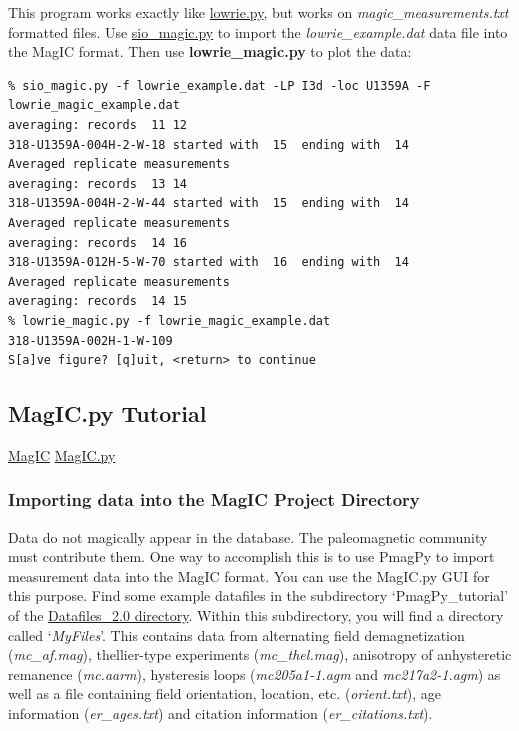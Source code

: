 \documentclass[11pt]{book}
\begin{document}
{{{This program works exactly like \href{#lowrie.py}{lowrie.py}, but works on {\it magic\_measurements.txt} formatted files.  Use \href{#sio_magic.py}{sio\_magic.py} to import the {\it lowrie\_example.dat} data file into the MagIC format.  Then use {\bf lowrie\_magic.py} to plot the data:

\begin{verbatim}
% sio_magic.py -f lowrie_example.dat -LP I3d -loc U1359A -F lowrie_magic_example.dat
averaging: records  11 12
318-U1359A-004H-2-W-18 started with  15  ending with  14
Averaged replicate measurements
averaging: records  13 14
318-U1359A-004H-2-W-44 started with  15  ending with  14
Averaged replicate measurements
averaging: records  14 16
318-U1359A-012H-5-W-70 started with  16  ending with  14
Averaged replicate measurements
averaging: records  14 15
% lowrie_magic.py -f lowrie_magic_example.dat 
318-U1359A-002H-1-W-109
S[a]ve figure? [q]uit, <return> to continue
\end{verbatim}


% 

\subsection{MagIC.py Tutorial}
\href{#MagIC}{MagIC}
\href{#MagIC.py}{MagIC.py}

\subsubsection{Importing  data into the MagIC Project Directory}
\label{sect:upload} 

Data do not magically appear in the database.  The paleomagnetic community must contribute them.  One way to accomplish this is to use PmagPy to import measurement data into the MagIC format.  You can use the MagIC.py GUI for this purpose.  Find some example datafiles in the subdirectory `PmagPy\_tutorial' of the \href{#Datafiles}{Datafiles\_2.0 directory}.
Within this subdirectory, you will find a directory called `{\it MyFiles}'.  This contains data from alternating field demagnetization ({\it mc\_af.mag}), thellier-type experiments ({\it mc\_thel.mag}),  anisotropy of anhysteretic remanence ({\it mc.aarm}), hysteresis loops ({\it mc205a1-1.agm} and {\it mc217a2-1.agm}) as well as a file containing  field orientation, location, etc. ({\it orient.txt}), age information ({\it er\_ages.txt}) and citation information ({\it er\_citations.txt}).    

}}}
\end{document}
